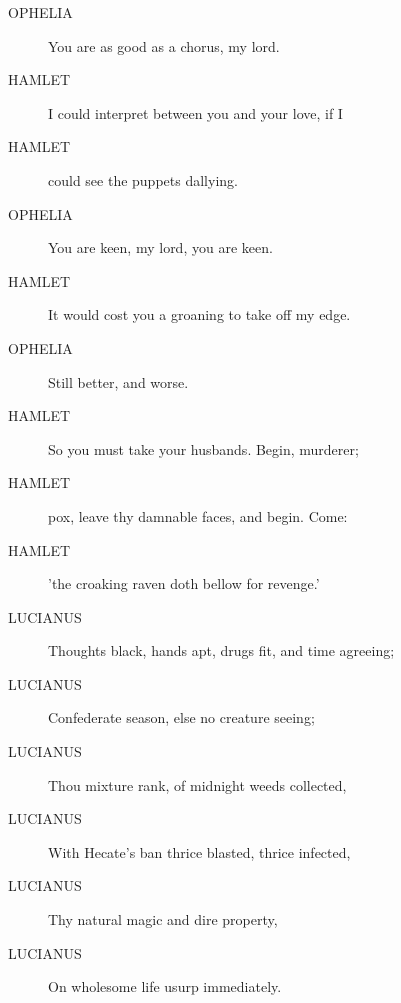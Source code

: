 \documentclass{article}
\begin{document}
\begin{description}
            
\item[OPHELIA] You are as good as a chorus, my lord.
\end{description}
          
\begin{description}
            
\item[HAMLET] I could interpret between you and your love, if I
\item[HAMLET] could see the puppets dallying.
\end{description}
          
\begin{description}
            
\item[OPHELIA] You are keen, my lord, you are keen.
\end{description}
          
\begin{description}
            
\item[HAMLET] It would cost you a groaning to take off my edge.
\end{description}
          
\begin{description}
            
\item[OPHELIA] Still better, and worse.
\end{description}
          
\begin{description}
            
\item[HAMLET] So you must take your husbands. Begin, murderer;
\item[HAMLET] pox, leave thy damnable faces, and begin. Come:
\item[HAMLET] 'the croaking raven doth bellow for revenge.'
\end{description}
          
\begin{description}
            
\item[LUCIANUS] Thoughts black, hands apt, drugs fit, and time agreeing;
\item[LUCIANUS] Confederate season, else no creature seeing;
\item[LUCIANUS] Thou mixture rank, of midnight weeds collected,
\item[LUCIANUS] With Hecate's ban thrice blasted, thrice infected,
\item[LUCIANUS] Thy natural magic and dire property,
\item[LUCIANUS] On wholesome life usurp immediately.
\end{description}
          
\end{document}
